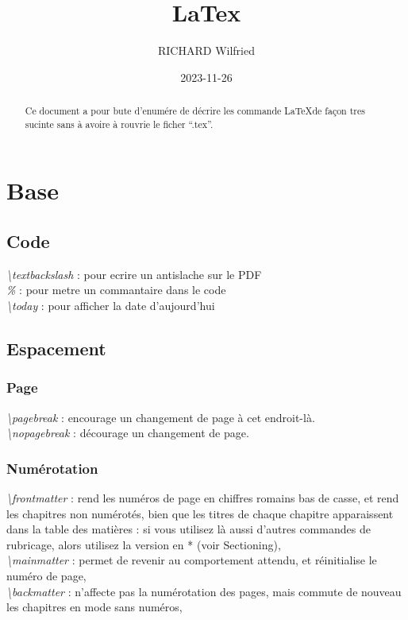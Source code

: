 \documentclass[a4paper,12pt]{report}
\author{RICHARD Wilfried}
\title{LaTex}
\date{2023-11-26}
\begin{document}
	\maketitle
	\tableofcontents
	\begin{abstract}
		Ce document a pour bute d'enumére de décrire les commande \LaTeX de façon tres sucinte sans à avoire à rouvrie le ficher \enquote{.tex}.
	\end{abstract}
	\section{Base}
		\subsection{Code}
			\textit{\textbackslash textbackslash} : pour ecrire un antislache sur le PDF\\
			\textit{\%} : pour metre un commantaire dans le code\\
			\textit{\textbackslash today} : pour afficher la date d'aujourd'hui
		\subsection{Espacement}
			\subsubsection{Page}
				\textit{\textbackslash pagebreak} : encourage un changement de page à cet endroit-là.\\
				\textit{\textbackslash nopagebreak} : décourage un changement de page.
				\subsubsection{Numérotation}
					\textit{\textbackslash frontmatter} : rend les numéros de page en chiffres romains bas de casse, et rend les chapitres non numérotés, bien que les titres de chaque chapitre apparaissent dans la table des matières : si vous utilisez là aussi d’autres commandes de rubricage, alors utilisez la version en * (voir Sectioning),\\
					\textit{\textbackslash mainmatter} : permet de revenir au comportement attendu, et réinitialise le numéro de page,\\
					\textit{\textbackslash backmatter} : n’affecte pas la numérotation des pages, mais commute de nouveau les chapitres en mode sans numéros,\\
\end{document}
